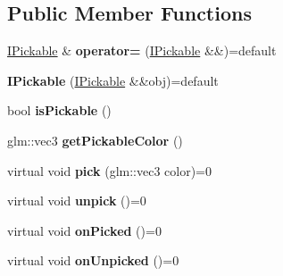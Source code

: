 \subsection*{Public Member Functions}
\begin{DoxyCompactItemize}
\item 
\hyperlink{classflw_1_1flf_1_1IPickable}{I\+Pickable} \& {\bfseries operator=} (\hyperlink{classflw_1_1flf_1_1IPickable}{I\+Pickable} \&\&)=default\hypertarget{classflw_1_1flf_1_1IPickable_ad5548ce0d61e0de87c326ca9996e4e63}{}\label{classflw_1_1flf_1_1IPickable_ad5548ce0d61e0de87c326ca9996e4e63}

\item 
{\bfseries I\+Pickable} (\hyperlink{classflw_1_1flf_1_1IPickable}{I\+Pickable} \&\&obj)=default\hypertarget{classflw_1_1flf_1_1IPickable_a23026eef800645cb54962075284409d3}{}\label{classflw_1_1flf_1_1IPickable_a23026eef800645cb54962075284409d3}

\item 
bool {\bfseries is\+Pickable} ()\hypertarget{classflw_1_1flf_1_1IPickable_a4314c9173e0cd472e7c4859cafdf9361}{}\label{classflw_1_1flf_1_1IPickable_a4314c9173e0cd472e7c4859cafdf9361}

\item 
glm\+::vec3 {\bfseries get\+Pickable\+Color} ()\hypertarget{classflw_1_1flf_1_1IPickable_a60a3e5e14ffc945860cb2d7d2d299cdd}{}\label{classflw_1_1flf_1_1IPickable_a60a3e5e14ffc945860cb2d7d2d299cdd}

\item 
virtual void {\bfseries pick} (glm\+::vec3 color)=0\hypertarget{classflw_1_1flf_1_1IPickable_a979510a0522d576a2201c0b6f1139dd5}{}\label{classflw_1_1flf_1_1IPickable_a979510a0522d576a2201c0b6f1139dd5}

\item 
virtual void {\bfseries unpick} ()=0\hypertarget{classflw_1_1flf_1_1IPickable_a77481a6bd8396869c521667ae5204a48}{}\label{classflw_1_1flf_1_1IPickable_a77481a6bd8396869c521667ae5204a48}

\item 
virtual void {\bfseries on\+Picked} ()=0\hypertarget{classflw_1_1flf_1_1IPickable_aaa0dcbb8e0b550ce47c1aace8e277697}{}\label{classflw_1_1flf_1_1IPickable_aaa0dcbb8e0b550ce47c1aace8e277697}

\item 
virtual void {\bfseries on\+Unpicked} ()=0\hypertarget{classflw_1_1flf_1_1IPickable_a98314352f99703305ac7ea382bf2ce2e}{}\label{classflw_1_1flf_1_1IPickable_a98314352f99703305ac7ea382bf2ce2e}

\end{DoxyCompactItemize}
